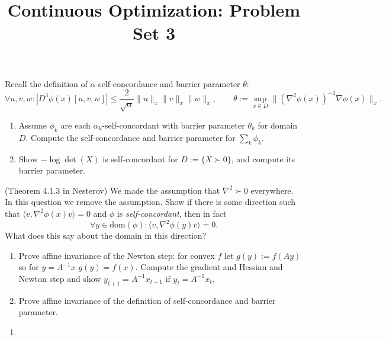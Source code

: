 \documentclass[addpoints,12pt,A4]{exam}
\title{Continuous Optimization: Problem Set 3}
\begin{document}
\maketitle

\begin{questions}

\question Recall the definition of $\alpha$-self-concordance and barrier parameter $\theta$:
\[ \forall u,v,w: | D^{3} \phi(x) [u,v,w] | \leq \frac{2}{\sqrt{\alpha}} \|u \|_{x} \|v\|_{x} \|w\|_{x}   , \qquad \theta := \sup_{x \in D} \|(\nabla^{2}\phi(x) )^{-1}\nabla \phi(x)\|_{x} .  \]
\begin{enumerate}
    \item Assume $\phi_{k}$ are each $\alpha_{k}$-self-concordant with barrier parameter $\theta_{k}$ for domain $D$. Compute the self-concordance and barrier parameter for $\sum_{k} \phi_{k}$. 
    \item Show $- \log \det(X)$ is self-concordant for $D := \{ X \succ 0 \}$, and compute its barrier parameter. 
\end{enumerate}
\begin{solution}
    
\end{solution}



\question (Theorem 4.1.3 in Nesterov) We made the assumption that $\nabla^{2} \succ 0$ everywhere. In this question we remove the assumption. Show if there is some direction such that $\langle v, \nabla^{2} \phi(x) v \rangle = 0$ and $\phi$ is \emph{self-concordant}, then in fact 
\[ \forall y \in \text{dom}(\phi) : \langle v, \nabla^{2} \phi(y) v \rangle = 0 .   \]
What does this say about the domain in this direction?
\begin{solution}
    
\end{solution}



\question 
\begin{enumerate}
    \item Prove affine invariance of the Newton step: for convex $f$ let $g(y) := f(A y)$ so for $y = A^{-1} x$ $g(y) = f(x)$. Compute the gradient and Hessian and Newton step and show $y_{t+1} = A^{-1} x_{t+1}$ if $y_{t} = A^{-1} x_{t}$. 
    \item Prove affine invariance of the definition of self-concordance and barrier parameter. 
\end{enumerate}
\begin{solution}
    \begin{enumerate}
        \item 
    \end{enumerate}
\end{solution}




\end{questions}
\end{document}
